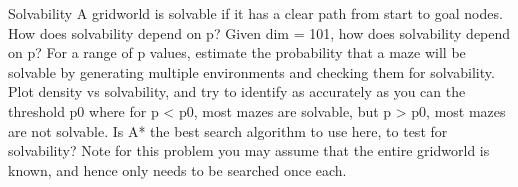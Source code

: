 \documentclass{homeworg}
\begin{document}
\newpage
\exercise*
Solvability A gridworld is solvable if it has a clear path from start to goal nodes. How does solvability depend on p? Given dim = 101, how does solvability depend on p? For a range of p values, estimate the probability that a maze will be solvable by generating multiple environments and checking them for solvability. Plot density vs solvability, and try to identify as accurately as you can the threshold p0 where for p < p0, most mazes are solvable, but p > p0, most mazes are not solvable. Is A* the best search algorithm to use here, to test for solvability? Note for this problem you may assume that the entire gridworld is known, and hence only needs to be searched once each.
\end{document}
